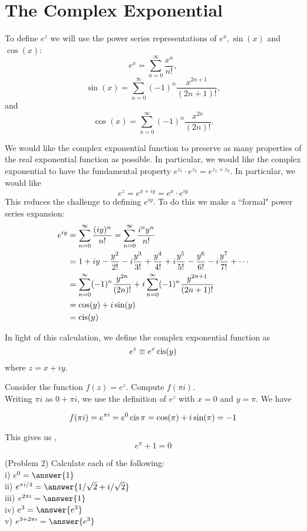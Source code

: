 \documentclass[handout]{ximera}
\begin{document}
\section{The Complex Exponential}

To define $e^z$ we will use the power series representations of $e^x, \sin(x)$ and $\cos(x)$:
\[
e^x = \sum_{n=0}^\infty \frac{x^n}{n!},
\]
\[
\sin(x) = \sum_{n=0}^\infty (-1)^n \frac{x^{2n+1}}{(2n+1)!},
\]
and
\[
\cos(x) = \sum_{n=0}^\infty (-1)^n \frac{x^{2n}}{(2n)!}.
\]

We would like the complex exponential function to preserve as many properties of the real exponential function as possible. 
In particular, we would like the complex exponential to have the fundamental property $e^{z_1}\cdot e^{z_2} = e^{z_1 + z_2}$.
In particular, we would like
\[
e^z = e^{x+iy} = e^x \cdot e^{iy}
\]
This reduces the challenge to defining $e^{iy}$. To do this we make a ``formal" power series expansion:
\begin{align*}
e^{iy} &= \sum_{n=0}^\infty \frac{(iy)^n}{n!} = \sum_{n=0}^\infty \frac{i^ny^n}{n!}\\
       &= 1+iy -\frac{y^2}{2!} -i\frac{y^3}{3!} + \frac{y^4}{4!} + i\frac{y^5}{5!} - \frac{y^6}{6!} -i \frac{y^7}{7!} + \cdots\\
       &= \sum_{n=0}^\infty (-1)^n\frac{y^{2n}}{(2n)!} + i\sum_{n=0}^\infty (-1)^n\frac{y^{2n+1}}{(2n+1)!}\\
       &= \cos(y) + i\sin(y)\\
       &= \operatorname{cis}(y)
\end{align*}


In light of this calculation, we define the complex exponential function as
\[
e^z \equiv e^x \operatorname{cis}(y) 
\]
where $z = x+iy$.

\begin{example}
Consider the function $f(z) = e^z$. Compute $f(\pi i)$.\\
Writing $\pi i$ as $0+\pi i$, we use the definition of $e^z$ with $x = 0 $ and $y= \pi$.
We have 

\[ f(\pi i) = e^{\pi i} = e^0 \operatorname{cis} \pi = \cos(\pi) + i\sin(\pi) = -1 \]

This gives us ,
\[
e^{\pi} +1 = 0
\]

\end{example}


\begin{problem}(Problem 2)
Calculate each of the following:\\
i) $e^0 = \answer{1}$\\
ii) $e^{\pi i /4} = \answer{1/\sqrt 2 + i/\sqrt 2}$\\
iii) $e^{2\pi i}= \answer{1}$\\
iv) $e^3 = \answer{e^3}$\\
v) $e^{3+2\pi i} = \answer{e^3}$\\
\end{problem} 
\end{document}

